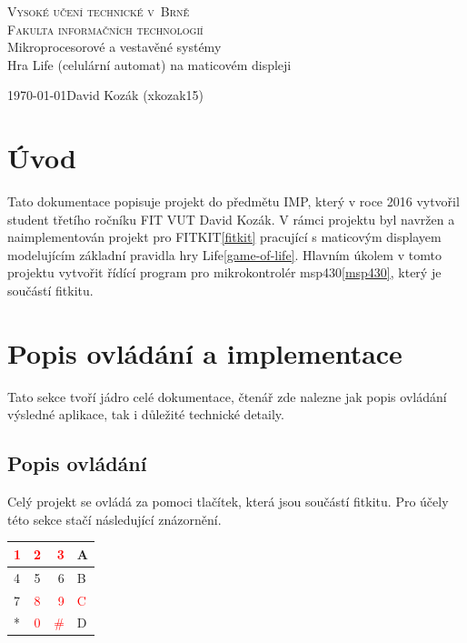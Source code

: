 \documentclass[12pt,a4paper,titlepage]{article}
\begin{document}
\begin{titlepage}
\begin{center}
    {
    	\Huge\textsc{Vysoké učení technické v~Brně}}\\
    \smallskip
    {
    	\huge\textsc{Fakulta informačních technologií}}\\
    \bigskip
    \huge{Mikroprocesorové a vestavěné systémy}\\
    \smallskip
    \Huge{Hra Life (celulární automat) na maticovém displeji}\\
\end{center}
    {\Large \today \hfill David Kozák (xkozak15)  }\\
    \smallskip
\end{titlepage}

\newpage
\tableofcontents
\newpage

\section{Úvod}
Tato dokumentace popisuje projekt do předmětu IMP, který v roce 2016 vytvořil student třetího ročníku FIT VUT David Kozák. V rámci projektu byl navržen a naimplementován projekt pro FITKIT\ref{fitkit} pracující s maticovým displayem modelujícím základní pravidla hry Life\ref{game-of-life}. Hlavním úkolem v tomto projektu vytvořit řídící program pro mikrokontrolér msp430\ref{msp430}, který je součástí fitkitu.
\section{Popis ovládání a implementace}
Tato sekce tvoří jádro celé dokumentace, čtenář zde nalezne jak popis ovládání výsledné aplikace, tak i důležité technické detaily.
\subsection{Popis ovládání}
Celý projekt se ovládá za pomoci tlačítek, která jsou součástí fitkitu. Pro účely této sekce stačí následující znázornění.

\begin{minipage}{\linewidth}
\bigskip
\begin{center}
  \begin{tabular}{ | l | c | r | l |}
    \hline
    \textcolor{red}{1} & \textcolor{red}{2} & \textcolor{red}{3} & A \\ \hline
    4 & 5 & 6 & B \\ \hline
    7 & \textcolor{red}{8} & \textcolor{red}{9} & \textcolor{red}{C} \\ \hline
    * & \textcolor{red}{0} & \textcolor{red}{\#} & D \\
    \hline
  \end{tabular}
   \label{fitkit:keyboard}
\end{center}
\bigskip
\end{minipage}
\end{document}
